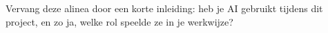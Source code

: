 
\chapter{}%
\label{ch:ai}


Vervang deze alinea door een korte inleiding: heb je AI gebruikt tijdens dit
project, en zo ja, welke rol speelde ze in je werkwijze?

\section{}%
\label{sec:ai-waarvoor}


